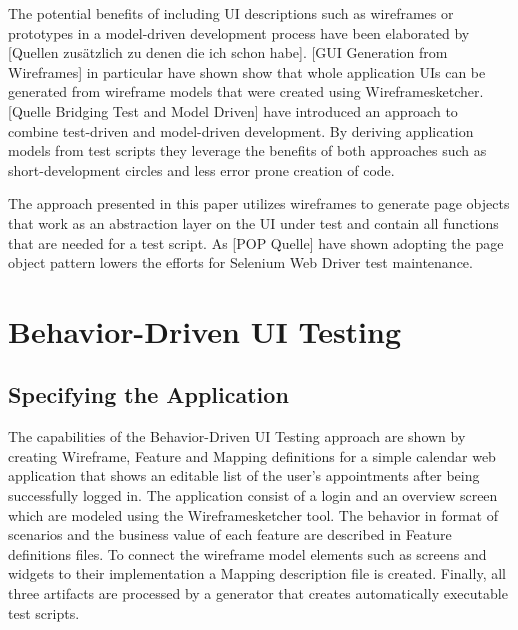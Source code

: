 \documentclass{sig-alternate-05-2015}
\begin{document}
The potential benefits of including UI descriptions such as wireframes or prototypes in a model-driven development process have been elaborated by [Quellen zusätzlich zu denen die ich schon habe].
[GUI Generation from Wireframes] in particular have shown show that whole application UIs can be generated from wireframe models that were created using Wireframesketcher.
[Quelle Bridging Test and Model Driven] have introduced an approach to combine test-driven and model-driven development.
By deriving application models from test scripts they leverage the benefits of both approaches such as short-development circles and less error prone creation of code.

The approach presented in this paper utilizes wireframes to generate page objects that work as an abstraction layer on the UI under test and contain all functions that are needed for a test script.
As [POP Quelle] have shown adopting the page object pattern lowers the efforts for Selenium Web Driver test maintenance.




\section{Behavior-Driven UI Testing}\label{sec:SpecificationDrivenUITesting}
\subsection{Specifying the Application}\label{sec:SpecifyingTheApplication} 
The capabilities of the Behavior-Driven UI Testing approach are shown by creating Wireframe, Feature and Mapping definitions for a simple calendar web application that shows an editable list of the user's appointments after being successfully logged in.
The application consist of a login and an overview screen which are modeled using the Wireframesketcher tool.
The behavior in format of scenarios and the business value of each feature are described in Feature definitions files.
To connect the wireframe model elements such as screens and widgets to their implementation a Mapping description file is created.
Finally, all three artifacts are processed by a generator that creates automatically executable test scripts.
\end{document}

